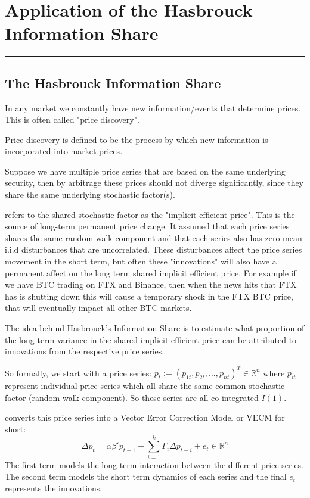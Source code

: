 \chapter{Application of the Hasbrouck Information Share}
\hrule
\vspace{40pt}

\section{The Hasbrouck Information Share}
In any market we constantly have new information/events that determine prices. This is often called "price discovery".

Price discovery is defined to be the process by which new information is incorporated into
market prices.

Suppose we have multiple price series that are based on the same underlying security, then by arbitrage these prices should not diverge significantly, since they share the same underlying stochastic factor(s).

\cite{HASBROUCK1995} refers to the shared stochastic factor as the "implicit efficient price".
This is the source of long-term permanent price change.
It assumed that each price series shares the same random walk component and that each series also has zero-mean i.i.d disturbances that are uncorrelated. 
These disturbances affect the price series movement in the short term, but often these
"innovations" will also have a permanent affect on the long term shared implicit efficient price. For example if we have BTC trading on FTX and Binance, then when the news hits
that FTX has is shutting down this will cause a temporary shock in the FTX BTC price,
that will eventually impact all other BTC markets.

The idea behind Hasbrouck's Information Share is to estimate what proportion of the long-term variance in the shared implicit efficient price can be attributed to innovations from the respective price series.

So formally, we start with a price series: $p_{t} := (p_{1t}, p_{2t}, \dots, p_{nt})^T \in \mathbb{R}^n$ where $p_{it}$ represent
individual price series which all share the same common stochastic factor (random walk component). So these series are all co-integrated $I(1)$.

\cite{HASBROUCK1995} converts this price series into a Vector Error Correction Model or VECM for short:
\begin{equation}
    \Delta p_{t} = \alpha \beta' p_{t-1} + \sum_{i=1}^k \Gamma_{i} \Delta p_{t-i} + e_{t} \in \mathbb{R}^n
\end{equation}
The first term models the long-term interaction between the different price series. The second term models the short term dynamics of each series and the final $e_{t}$ represents the innovations.

